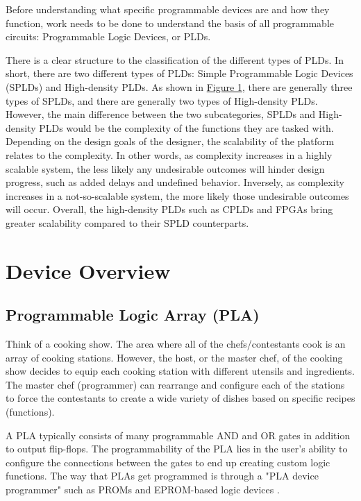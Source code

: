 \documentclass[12pt]{article}
\begin{document}
        Before understanding what specific programmable devices are and how they 
        function, work needs to be done to understand the basis of all programmable 
        circuits: Programmable Logic Devices, or PLDs. 

        There is a clear structure to the classification of the different types of 
        PLDs. In short, there are two different types of PLDs: Simple Programmable 
        Logic Devices (SPLDs) and High-density PLDs. As shown in 
        \hyperref[pld_tree_diagram]{Figure 1}, there are generally three types of 
        SPLDs, and there are generally two types of High-density PLDs. However, 
        the main difference between the two subcategories, SPLDs and High-density 
        PLDs would be the complexity of the functions they are tasked with. Depending 
        on the design goals of the designer, the scalability of the platform 
        relates to the complexity. In other words, as complexity increases in a 
        highly scalable system, the less likely any undesirable outcomes will 
        hinder design progress, such as added delays and undefined behavior. 
        Inversely, as complexity increases in a not-so-scalable system, the more 
        likely those undesirable outcomes will occur. Overall, the high-density
        PLDs such as CPLDs and FPGAs bring greater scalability compared to their
        SPLD counterparts.

    \section{Device Overview}
        
        \subsection{Programmable Logic Array (PLA)}

        Think of a cooking show. The area where all of the chefs/contestants cook is
        an array of cooking stations. However, the host, or the master chef, of the 
        cooking show decides to equip each cooking station with different utensils 
        and ingredients. The master chef (programmer) can rearrange and configure 
        each of the stations to force the contestants to create a wide variety of 
        dishes based on specific recipes (functions). 

        A PLA typically consists of many programmable AND and OR gates in addition
        to output flip-flops. The programmability of the PLA lies in the user's
        ability to configure the connections between the gates to end up creating
        custom logic functions. The way that PLAs get programmed is through a "PLA
        device programmer" such as PROMs and EPROM-based logic devices 
        \autocite{cornell}. 
\end{document}
